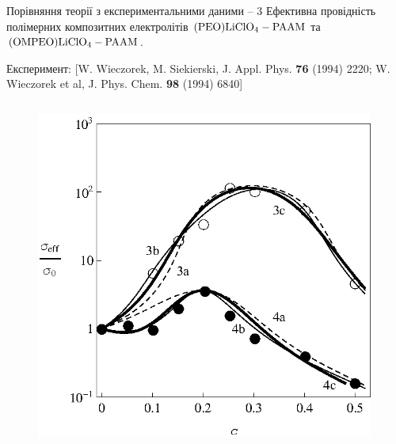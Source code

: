 \documentclass[10pt]{beamer}
\begin{document}
\begin{frame}{Порівняння теорії з експериментальними даними -- 3}
Ефективна провідність полімерних композитних електролітів $\rm (PEO)LiClO_4-PAAM$ та $\rm (OMPEO)LiClO_4-PAAM$.
\vspace{-5pt}

\scriptsize{Експеримент: [W. Wieczorek, M. Siekierski, J. Appl. Phys. {\bf 76} (1994) 2220; W. Wieczorek et al, J. Phys. Chem. {\bf 98} (1994) 6840]}
\vspace{-5pt}

\footnotesize
\begin{columns}[T,onlytextwidth]
      \begin{figure}
        \centering
        \includegraphics[width=0.99\textwidth]{images/Fig3_PEO-PAAM_LiClO4_OMPEO-PAAM_LiClO4.eps}
      \end{figure}


\end{columns}
\end{frame}
\end{document}
